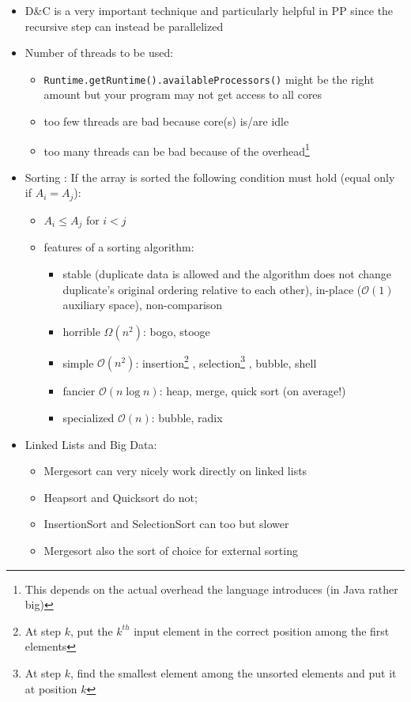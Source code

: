 \documentclass[a4paper]{article}
\newcommand{\inline}[1]{\lstinline!#1!}%
\begin{document}
\begin{itemize}
\item D\&C is a very important technique and particularly helpful in PP since the recursive step can instead be parallelized
\item Number of threads to be used: 
\begin{itemize}
\item \inline{Runtime.getRuntime().availableProcessors()} might be the right amount but your program may not get access to all cores
\item too few threads are bad because core(s) is/are idle
\item too many threads can be bad because of the overhead\footnote{This depends on the actual overhead the language introduces (in Java rather big)}
\end{itemize}
\item Sorting : If the array is sorted the following condition must hold (equal only if $A_i=A_j$): 
\begin{itemize}
\item $A_i\leq A_j$  for $i<j$
\item features of a sorting algorithm:
\begin{itemize}
\item stable (duplicate data is allowed and the algorithm does not change duplicate's original ordering relative to each other), in-place ($\mathcal{O}(1)$ auxiliary space), non-comparison
\item horrible $\Omega(n^2 )$: bogo, stooge
\item simple $\mathcal{O}(n^2 )$: insertion\footnote{At step $k$, put the $k^{th}$ input element in the correct position among the first elements} , selection\footnote{At step $k$, find the smallest element among the unsorted elements and put it at position $k$} , bubble, shell
\item fancier $\mathcal{O}(n \log⁡ n )$: heap, merge, quick sort (on average!)
\item specialized $\mathcal{O}(n)$: bubble, radix
\end{itemize}
\end{itemize}
\item Linked Lists and Big Data: 
\begin{itemize}
\item Mergesort can very nicely work directly on linked lists
\item Heapsort and Quicksort do not;
\item InsertionSort and SelectionSort can too but slower
\item Mergesort also the sort of choice for external sorting

\end{itemize}
\end{itemize}
\end{document}
